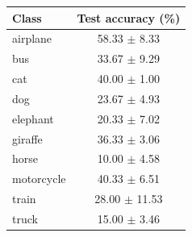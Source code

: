 \begin{tabular}{l c}
\hline
Class & Test accuracy (\%) \\
\hline
airplane & 58.33 $\pm$ 8.33 \\
bus & 33.67 $\pm$ 9.29 \\
cat & 40.00 $\pm$ 1.00 \\
dog & 23.67 $\pm$ 4.93 \\
elephant & 20.33 $\pm$ 7.02 \\
giraffe & 36.33 $\pm$ 3.06 \\
horse & 10.00 $\pm$ 4.58 \\
motorcycle & 40.33 $\pm$ 6.51 \\
train & 28.00 $\pm$ 11.53 \\
truck & 15.00 $\pm$ 3.46 \\
\hline
\end{tabular}
